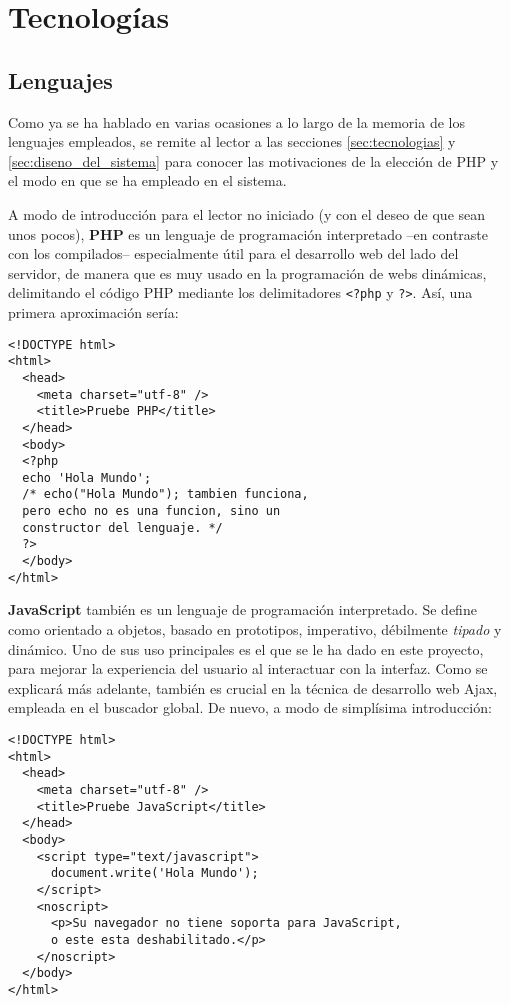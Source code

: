 \section{Tecnologías}

\subsection{Lenguajes}

Como ya se ha hablado en varias ocasiones a lo largo de la memoria de los
lenguajes empleados, se remite al lector a las secciones \ref{sec:tecnologias}
y \ref{sec:diseno_del_sistema} para conocer las motivaciones de la elección de
PHP y el modo en que se ha empleado en el sistema.

A modo de introducción para el lector no iniciado (y con el deseo de que sean
unos pocos), \textbf{PHP} es un lenguaje de programación interpretado --en
contraste con los compilados-- especialmente útil para el desarrollo web del
lado del servidor, de manera que es muy usado en la programación de webs
dinámicas, delimitando el código PHP mediante los delimitadores
\verb|<?php| y \verb|?>|. Así, una primera aproximación sería:

\begin{lstlisting}
<!DOCTYPE html>
<html>
  <head>
    <meta charset="utf-8" />
    <title>Pruebe PHP</title>
  </head>
  <body>
  <?php
  echo 'Hola Mundo';
  /* echo("Hola Mundo"); tambien funciona,
  pero echo no es una funcion, sino un
  constructor del lenguaje. */
  ?>
  </body>
</html>
\end{lstlisting}

\textbf{JavaScript} también es un lenguaje de programación interpretado. Se
define como orientado a objetos, basado en prototipos, imperativo, débilmente
\textit{tipado} y dinámico. Uno de sus uso principales es el que se le ha dado
en este proyecto, para mejorar la experiencia del usuario al interactuar con la
interfaz. Como se explicará más adelante, también es crucial en la técnica de
desarrollo web Ajax, empleada en el buscador global. De nuevo, a modo de
simplísima introducción:

\begin{lstlisting}
<!DOCTYPE html>
<html>
  <head>
    <meta charset="utf-8" />
    <title>Pruebe JavaScript</title>
  </head>
  <body>
    <script type="text/javascript">
      document.write('Hola Mundo');
    </script>
    <noscript>
      <p>Su navegador no tiene soporta para JavaScript,
      o este esta deshabilitado.</p>
    </noscript>
  </body>
</html>
\end{lstlisting}

